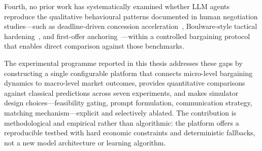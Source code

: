 Fourth, no prior work has systematically examined whether LLM agents reproduce the qualitative behavioural patterns documented in human negotiation studies---such as deadline-driven concession acceleration~\cite{roth1988deadline}, Boulware-style tactical hardening~\cite{raiffa1982}, and first-offer anchoring~\cite{galinsky2001}---within a controlled bargaining protocol that enables direct comparison against those benchmarks.

The experimental programme reported in this thesis addresses these gaps by constructing a single configurable platform that connects micro-level bargaining dynamics to macro-level market outcomes, provides quantitative comparisons against classical predictions across seven experiments, and makes simulator design choices---feasibility gating, prompt formulation, communication strategy, matching mechanism---explicit and selectively ablated.  The contribution is methodological and empirical rather than algorithmic: the platform offers a reproducible testbed with hard economic constraints and deterministic fallbacks, not a new model architecture or learning algorithm.
